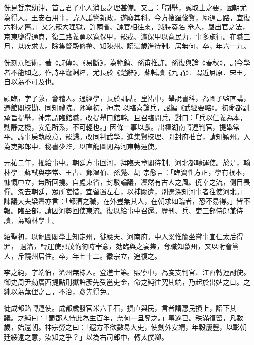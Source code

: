 \begin{pinyinscope}
 侁見哲宗幼沖，首言君子小人消長之理甚備。又言：「制舉，誠取士之要，國朝尤為得人。王安石用事，諱人詆訾新政，遂廢其科。今方搜羅俊賢，廓通言路，宜復六科之舊。」又乞罷大理獄，許兩省、諫官相往來，減特奏名
 舉人，嚴出官之法，京東鹽得通商，復三路義勇以寬保甲，罷戎、瀘保甲以寬民力，事多施行。在職三月，以疾求去。除集賢殿修撰、知陳州。詔滿歲進待制。居無何，卒，年六十九。



 侁刻意經術，著《詩傳》、《易斷》，為範鎮、孫甫推許。孫復與論《春秋》，謂今學者不能如之。作詩平澹淵粹，尤長於《楚辭》，蘇軾讀《九誦》，謂近屈原、宋玉，自以為不可及也。



 顧臨，字子敦，會稽人。通經學，長於訓詁。皇祐中，舉說書科，為國子監直講，遷館閣校勘、同知禮院。熙寧初，神宗
 以臨喜論兵，詔編《武經要略》。初命都副承旨提舉，神宗謂臨館職，改提舉曰館幹。且召臨問兵，對曰：「兵以仁義為本，動靜之機，安危所系，不可輕也。」因條十事以獻。出權湖南轉運判官，提舉常平。議事戾執政意，罷歸。改同判武學，進集賢校理、開封府推官，請知穎州。入為吏部郎中、秘書少監，以直龍圖閣為河東轉運使。



 元祐二年，擢給事中。朝廷方事回河，拜臨天章閣待制、河北都轉運使。於是，翰林學士蘇軾與李常、王古、鄧溫伯、孫覺、胡
 宗愈言：「臨資性方正，學有根本，慷慨中立，無所回撓。自處東省，封駁論議，凜然有古人之風。僥幸之流，側目畏憚。忽去朝廷，眾所嗟惜，宜留置左右，以補闕遺，別選深知河事者往使河北。」諫議大夫梁燾亦言：「都漕之職，在外豈無其人，在朝求如臨者，恐不易得。」皆不報。臨至部，請因河勢回使東流。復以給事中召還。歷刑、兵、吏三部侍郎兼侍讀，為翰林學士。



 紹聖初，以龍圖閣學士知定州，徙應天、河南府。中人梁惟簡坐嘗事宣仁太后得罪，
 過洛，轉運使郭茂恂徇時宰意，劾臨與之宴集，奪職知歙州，又以附會黨人，斥饒州居住。卒，年七十二。徽宗立，追復之。



 李之純，字端伯，滄州無棣人。登進士第。熙寧中，為度支判官、江西轉運副使。御史周尹劾廣西提點刑獄許彥先受邕吏金，命之純往究其端，乃起於出婢之口。之純以為蕪俚之言，不治，彥先得免。



 徙成都路轉運使。成都歲發官米六千石，損直與民，言者謂惠民損上，詔下其
 議。之純曰：「蜀郡人恃此為生百年，奈何一旦奪之。」事遂已。秩滿復留，凡數歲，始還朝。神宗勞之曰：「遐方不欲數易大吏，使劍外安靖，年穀屢豐，以彰朝廷綏遠之意，汝知之乎？」以為右司郎中，轉太僕卿。




\end{pinyinscope}
